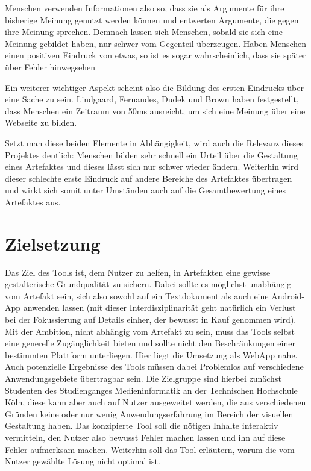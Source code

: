 Menschen verwenden Informationen also so, dass sie als Argumente für ihre bisherige Meinung genutzt werden können und entwerten Argumente, die gegen ihre Meinung sprechen. Demnach lassen sich Menschen, sobald sie sich eine Meinung gebildet haben, nur schwer vom Gegenteil überzeugen.
Haben Menschen einen positiven Eindruck von etwas, so ist es sogar wahrscheinlich, dass sie später über Fehler hinwegsehen \cite{campbell1996fitting}

Ein weiterer wichtiger Aspekt scheint also die Bildung des ersten Eindrucks über eine Sache zu sein. Lindgaard, Fernandes, Dudek und Brown haben festgestellt, dass Menschen ein Zeitraum von 50ms ausreicht, um sich eine Meinung über eine Webseite zu bilden. \cite{lindgaard2006attention}

Setzt man diese beiden Elemente in Abhängigkeit, wird auch die Relevanz dieses Projektes deutlich: Menschen bilden sehr schnell ein Urteil über die Gestaltung eines Artefaktes und dieses lässt sich nur schwer wieder ändern. Weiterhin wird dieser schlechte erste Eindruck auf andere Bereiche des Artefaktes übertragen und wirkt sich somit unter Umständen auch auf die Gesamtbewertung eines Artefaktes aus.


\section{Zielsetzung}
Das Ziel des Tools ist, dem Nutzer zu helfen, in Artefakten eine gewisse gestalterische Grundqualität zu sichern. Dabei sollte es möglichst unabhängig vom Artefakt sein, sich also sowohl auf ein Textdokument als auch eine Android-App anwenden lassen (mit dieser Interdisziplinarität geht natürlich ein Verlust bei der Fokussierung auf Details einher, der bewusst in Kauf genommen wird).
Mit der Ambition, nicht abhängig vom Artefakt zu sein, muss das Tools selbst eine generelle Zugänglichkeit bieten und sollte nicht den Beschränkungen einer bestimmten Plattform unterliegen. Hier liegt die Umsetzung als WebApp nahe. Auch potenzielle Ergebnisse des Tools müssen dabei Problemlos auf verschiedene Anwendungsgebiete übertragbar sein.
Die Zielgruppe sind hierbei zunächst Studenten des Studienganges Medieninformatik an der Technischen Hochschule Köln, diese kann aber auch auf Nutzer ausgeweitet werden, die aus verschiedenen Gründen keine oder nur wenig Anwendungserfahrung im Bereich der visuellen Gestaltung haben.
Das konzipierte Tool soll die nötigen Inhalte interaktiv vermitteln, den Nutzer also bewusst Fehler machen lassen und ihn auf diese Fehler aufmerksam machen. Weiterhin soll das Tool erläutern, warum die vom Nutzer gewählte Lösung nicht optimal ist.

